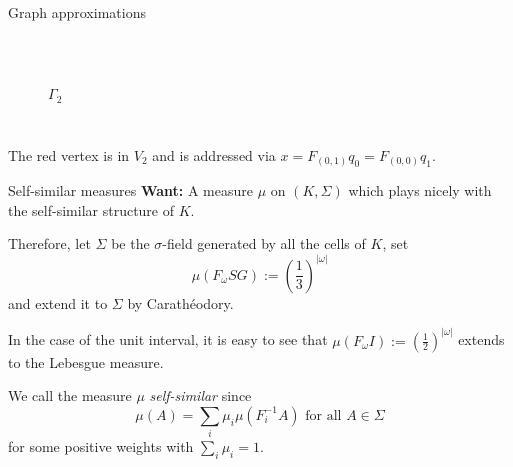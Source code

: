 \begin{frame}{Graph approximations}
\begin{example}
\begin{enumerate}
\begin{columns}[c]
\begin{figure}
\\
                \centering
                \(\Gamma_2 \)
            \end{figure}
        \end{columns}
    \end{enumerate}
    \end{example}
    The red vertex is in \(V_2 \) and is addressed via \(x = F_{(0, 1)}q_0 = F_{(0,0)}q_1 \).
\end{frame}

\begin{frame}{Self-similar measures}
    \textbf{Want:} A measure \(\mu \) on \((K, \Sigma) \) which plays nicely with the self-similar structure of \(K \).

    Therefore, let \(\Sigma \) be the \(\sigma \)-field generated by all the cells of \(K \), set
    \[ \mu(F_\omega SG) := \left(\frac{1}{3} \right)^{|\omega |} \]
    and extend it to \(\Sigma \) by Carathéodory.

    In the case of the unit interval, it is easy to see that \( \mu(F_\omega I) := \left( \frac{1}{2} \right)^{|\omega |} \) extends to the Lebesgue measure.

    \begin{definition}
        We call the measure \(\mu \) \textit{self-similar} since
        \[ \mu(A) = \sum_i \mu_i \mu(F_i^{-1} A) \text{ for all } A \in \Sigma \]
        for some positive weights with \(\sum_i \mu_i = 1 \).
    \end{definition}
\end{frame}